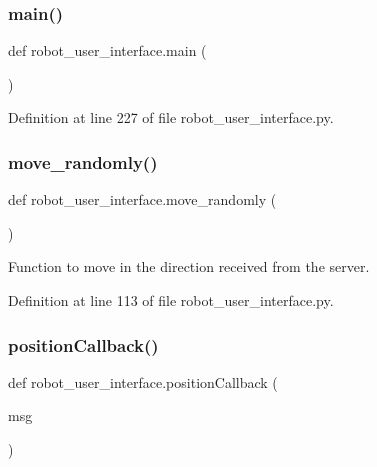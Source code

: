 \subsubsection{\texorpdfstring{main()}{main()}}
{\footnotesize\ttfamily def robot\+\_\+user\+\_\+interface.\+main (\begin{DoxyParamCaption}{ }\end{DoxyParamCaption})}



Definition at line 227 of file robot\+\_\+user\+\_\+interface.\+py.

\mbox{\label{namespacerobot__user__interface_a137d7201aae4fbac4990876227d162f1}} 
\subsubsection{\texorpdfstring{move\+\_\+randomly()}{move\_randomly()}}
{\footnotesize\ttfamily def robot\+\_\+user\+\_\+interface.\+move\+\_\+randomly (\begin{DoxyParamCaption}{ }\end{DoxyParamCaption})}



Function to move in the direction received from the server. 



Definition at line 113 of file robot\+\_\+user\+\_\+interface.\+py.

\mbox{\label{namespacerobot__user__interface_ac0334cd2b07f8bc4474062eaaceab902}} 
\subsubsection{\texorpdfstring{position\+Callback()}{positionCallback()}}
{\footnotesize\ttfamily def robot\+\_\+user\+\_\+interface.\+position\+Callback (\begin{DoxyParamCaption}\item[{}]{msg }\end{DoxyParamCaption})}



